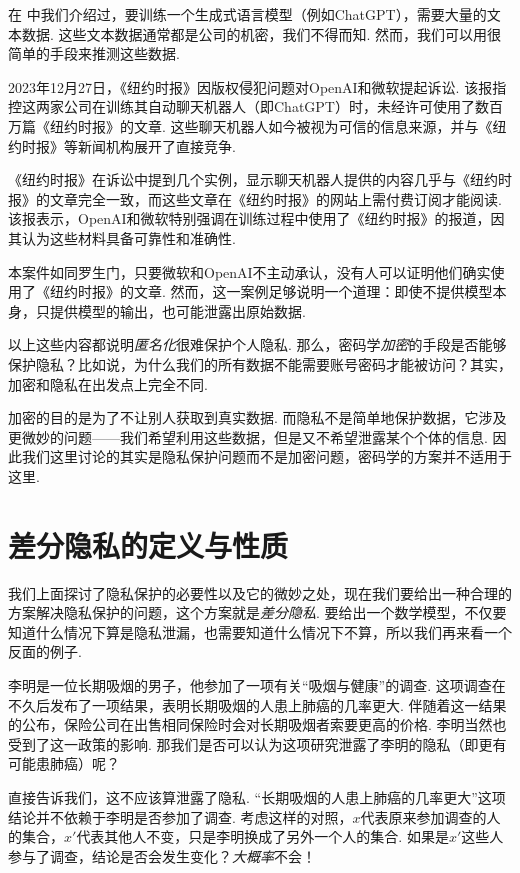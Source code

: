 在 中我们介绍过，要训练一个生成式语言模型（例如ChatGPT），需要大量的文本数据. 这些文本数据通常都是公司的机密，我们不得而知. 然而，我们可以用很简单的手段来推测这些数据. 

2023年12月27日，《纽约时报》因版权侵犯问题对OpenAI和微软提起诉讼. 该报指控这两家公司在训练其自动聊天机器人（即ChatGPT）时，未经许可使用了数百万篇《纽约时报》的文章. 这些聊天机器人如今被视为可信的信息来源，并与《纽约时报》等新闻机构展开了直接竞争. 

《纽约时报》在诉讼中提到几个实例，显示聊天机器人提供的内容几乎与《纽约时报》的文章完全一致，而这些文章在《纽约时报》的网站上需付费订阅才能阅读. 该报表示，OpenAI和微软特别强调在训练过程中使用了《纽约时报》的报道，因其认为这些材料具备可靠性和准确性. 

本案件如同罗生门，只要微软和OpenAI不主动承认，没有人可以证明他们确实使用了《纽约时报》的文章. 然而，这一案例足够说明一个道理：即使不提供模型本身，只提供模型的输出，也可能泄露出原始数据.

\begin{remark}
以上这些内容都说明\emph{匿名化}很难保护个人隐私. 那么，密码学\emph{加密}的手段是否能够保护隐私？比如说，为什么我们的所有数据不能需要账号密码才能被访问？其实，加密和隐私在出发点上完全不同. 

加密的目的是为了不让别人获取到真实数据. 而隐私不是简单地保护数据，它涉及更微妙的问题——我们希望利用这些数据，但是又不希望泄露某个个体的信息. 因此我们这里讨论的其实是隐私保护问题而不是加密问题，密码学的方案并不适用于这里.
\end{remark}

\section{差分隐私的定义与性质}

我们上面探讨了隐私保护的必要性以及它的微妙之处，现在我们要给出一种合理的方案解决隐私保护的问题，这个方案就是\emph{差分隐私}. 要给出一个数学模型，不仅要知道什么情况下算是隐私泄漏，也需要知道什么情况下不算，所以我们再来看一个反面的例子. 

李明是一位长期吸烟的男子，他参加了一项有关“吸烟与健康”的调查. 这项调查在不久后发布了一项结果，表明长期吸烟的人患上肺癌的几率更大. 伴随着这一结果的公布，保险公司在出售相同保险时会对长期吸烟者索要更高的价格. 李明当然也受到了这一政策的影响. 那我们是否可以认为这项研究泄露了李明的隐私（即更有可能患肺癌）呢？

直接告诉我们，这不应该算泄露了隐私. “长期吸烟的人患上肺癌的几率更大”这项结论并不依赖于李明是否参加了调查. 考虑这样的对照，$x$代表原来参加调查的人的集合，$x'$代表其他人不变，只是李明换成了另外一个人的集合. 如果是$x'$这些人参与了调查，结论是否会发生变化？\emph{大概率}不会！

